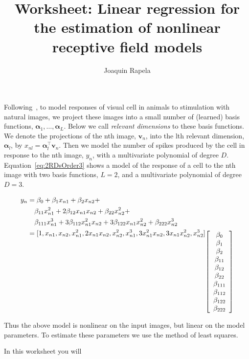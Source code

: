 \documentclass[12pt]{article}
\title{Worksheet: Linear regression for the estimation of nonlinear receptive
field models}
\author{Joaquin Rapela}
\begin{document}
\maketitle

Following~\citet{rapelaEtAl06}, to model responses of visual cell in animals to
stimulation with natural images, we
project these images into a small number of (learned) basis
functions, $\bm{\alpha}_1,\ldots,\bm{\alpha}_L$. Below we call \emph{relevant
dimensions} to these basis functions. We denote the projections of the nth
image, $\mathbf{v}_n$, into the lth relevant dimension, $\bm{\alpha}_l$, by
$x_{nl}=\bm{\alpha}_l^\intercal\mathbf{v}_n$. Then we model the number of spikes produced by the cell
in response to the nth image, $y_n$, with a multivariate polynomial of degree $D$.
Equation~\ref{eq:2RDsOrder3} shows a model of the response of
a cell to the nth image with
two basis functions, $L=2$, and a
multivariate polynomial of degree $D=3$.

\begin{align}
    y_n&=\beta_0+\beta_1x_{n1}+\beta_2x_{n2}+\nonumber\\
       &\quad\beta_{11}x_{n1}^2+2\beta_{12}x_{n1}x_{n2}+\beta_{22}x_{n2}^2+\nonumber\\
       &\quad\beta_{111}x_{n1}^3+3\beta_{112}x_{n1}^2x_{n2}+3\beta_{122}x_{n1}x_{n2}^2+\beta_{222}x_{n2}^3\nonumber\\
       &=[1,x_{n1},x_{n2},x_{n1}^2,2x_{n1}x_{n2},x_{n2}^2,x_{n1}^3,3x_{n1}^2x_{n2},3x_{n1}x_{n2}^2,x_{n2}^3]
         \raisebox{-5.6em}{$\left[\begin{array}{c}
             \beta_0\\\beta_1\\\beta_2\\\beta_{11}\\\beta_{12}\\\beta_{22}\\\beta_{111}\\\beta_{112}\\\beta_{122}\\\beta_{222}
                                \end{array}\right]$}
    \label{eq:2RDsOrder3}
\end{align}

Thus the above model is nonlinear on the input images, but linear on the
model parameters. To estimate these parameters we use the method of least squares.

In this worksheet you will
\end{document}
